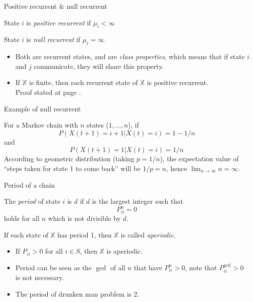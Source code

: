 \documentclass[mathserif]{beamer}
\begin{document}
\begin{frame}{Positive recurrent \& null recurrent}
	\begin{definition}
		State $i$ is \textit{positive recurrent} if $\mu_i < \infty$
	\end{definition}
	\begin{definition}
		State $i$ is \textit{null recurrent} if $\mu_i = \infty$
	\end{definition}
	\begin{itemize}
		\item Both are recurrent states, and are \textit{class properties}, which means that if state $i$ and $j$ communicate, they will share this property.
		\item If $\mathbb{X}$ is finite, then each recurrent state of $\mathbb{X}$ is positive recurrent.\\
			Proof stated at page \pageref{finite_pos_rec}.
	\end{itemize}
\end{frame}

\begin{frame}{Example of null recurrent}
	\begin{example}
		For a Markov chain with $n$ states ($1,\ldots,n$), if 
		\[
		P(X(t+1)=i+1|X(t)=i) = 1-1/n
		\]
		and
		\[
		P(X(t+1)=1|X(t)=i) = 1/n
		\]
		According to geometric distribution (taking $p = 1/n$), the expectation value of ``steps taken for state 1 to come back'' will be $1/p = n$, hence $\lim_{n\to\infty} n = \infty$.
	\end{example}
\end{frame}

\begin{frame}{Period of a chain}
	\begin{definition}
		The \textit{period} of state $i$ is $d$ if $d$ is the largest integer such that
		\[
		P^n_{ii} = 0
		\]
		holds for all $n$ which is not divisible by $d$.
	\end{definition}
	\begin{definition}
		If each state of $\mathbb{X}$ has period 1, then $\mathbb{X}$ is called \textit{aperiodic}.
	\end{definition}
	\begin{itemize}
		\item If $P_{ii} > 0$ for all $i \in S$, then $\mathbb{X}$ is aperiodic.
		\item Period can be seen as the $\gcd$ of all $n$ that have $P^n_{ii} > 0$, note that $P^{\gcd}_{ii} > 0$ is not necessary.
		\item The period of drunken man problem is 2.
	\end{itemize}
\end{frame}
\end{document}
